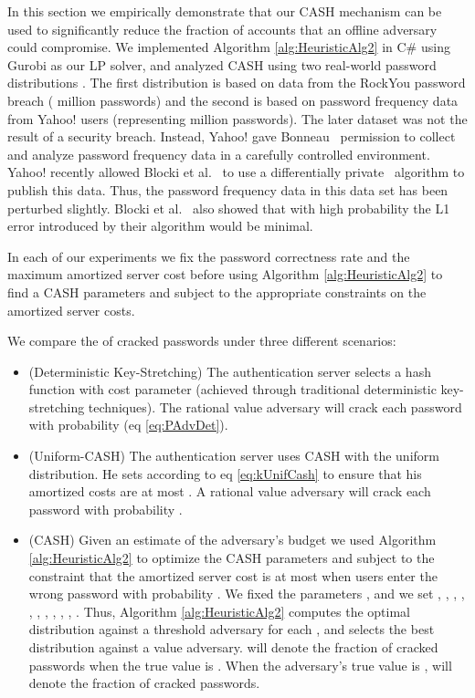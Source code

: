 In this section we empirically demonstrate that our CASH mechanism can be used to significantly reduce the fraction of accounts that an offline adversary could compromise. We implemented Algorithm \ref{alg:HeuristicAlg2} in C\# using Gurobi as our LP solver, and analyzed CASH using two real-world password distributions . The first distribution is based on data from the RockYou password breach ( million passwords) and the second is based on password frequency data from Yahoo! users (representing  million passwords). The later dataset was not the result of a security breach. Instead, Yahoo! gave Bonneau~\cite{bonneau2012science} permission to collect and analyze password frequency data in a carefully controlled environment. Yahoo! recently allowed Blocki et al.~\cite{blocki2016differentially} to use a differentially private~\cite{dwork2006calibrating} algorithm to publish this data. Thus, the password frequency data in this data set has been perturbed slightly.  Blocki et al.~\cite{blocki2016differentially} also showed that with high probability the L1 error introduced by their algorithm would be minimal. 


In each of our experiments we fix the password correctness rate  and the maximum amortized server cost  before using Algorithm \ref{alg:HeuristicAlg2} to find a CASH parameters  and  subject to the appropriate constraints on the amortized server costs. 

We compare the  of cracked passwords under three different scenarios: 
\begin{itemize}
\item (Deterministic Key-Stretching) The authentication server selects a hash function   with cost parameter   (achieved through traditional deterministic key-stretching techniques). The rational value  adversary will crack each password with probability  (eq \ref{eq:PAdvDet}).   
\item (Uniform-CASH) The authentication server uses CASH with the uniform distribution. He sets  according to eq \ref{eq:kUnifCash}
to ensure that his amortized costs are at most . A rational value  adversary will crack each password with probability . 

\item (CASH) Given an estimate  of the adversary's budget we used Algorithm \ref{alg:HeuristicAlg2} to optimize the CASH parameters  and  subject to the constraint that the amortized server cost is at most  when users enter the wrong password with probability . We fixed the parameters , and we set , , , , ,  , , , , , . Thus, Algorithm \ref{alg:HeuristicAlg2} computes the optimal distribution against a threshold  adversary for each , and selects the best distribution  against a value  adversary.   will denote the fraction of cracked passwords when the true value is . When the adversary's true value is ,   will denote the fraction of cracked passwords.  
\end{itemize}

